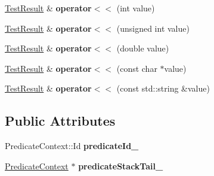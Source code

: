 \begin{DoxyCompactItemize}
\item 
\hypertarget{class_json_test_1_1_test_result_aa4e9ebaae16ffa2fa9538d4bd0ecdd4e}{\hyperlink{class_json_test_1_1_test_result}{Test\+Result} \& {\bfseries operator$<$$<$} (int value)}\label{class_json_test_1_1_test_result_aa4e9ebaae16ffa2fa9538d4bd0ecdd4e}

\item 
\hypertarget{class_json_test_1_1_test_result_a9023e594723a1711283c61b48f6fcefc}{\hyperlink{class_json_test_1_1_test_result}{Test\+Result} \& {\bfseries operator$<$$<$} (unsigned int value)}\label{class_json_test_1_1_test_result_a9023e594723a1711283c61b48f6fcefc}

\item 
\hypertarget{class_json_test_1_1_test_result_a5b8c77121387924383435fe747cf0f0c}{\hyperlink{class_json_test_1_1_test_result}{Test\+Result} \& {\bfseries operator$<$$<$} (double value)}\label{class_json_test_1_1_test_result_a5b8c77121387924383435fe747cf0f0c}

\item 
\hypertarget{class_json_test_1_1_test_result_ab04c79636e1bebcd6d38ecf7c8e24d10}{\hyperlink{class_json_test_1_1_test_result}{Test\+Result} \& {\bfseries operator$<$$<$} (const char $\ast$value)}\label{class_json_test_1_1_test_result_ab04c79636e1bebcd6d38ecf7c8e24d10}

\item 
\hypertarget{class_json_test_1_1_test_result_a81f7dfd1bf2233a93a8f04dfb0054a93}{\hyperlink{class_json_test_1_1_test_result}{Test\+Result} \& {\bfseries operator$<$$<$} (const std\+::string \&value)}\label{class_json_test_1_1_test_result_a81f7dfd1bf2233a93a8f04dfb0054a93}

\end{DoxyCompactItemize}
\subsection*{Public Attributes}
\begin{DoxyCompactItemize}
\item 
\hypertarget{class_json_test_1_1_test_result_a5bf0205db3dbf28a2d3d1ed32c931d9b}{Predicate\+Context\+::\+Id {\bfseries predicate\+Id\+\_\+}}\label{class_json_test_1_1_test_result_a5bf0205db3dbf28a2d3d1ed32c931d9b}

\item 
\hypertarget{class_json_test_1_1_test_result_aad36badc65d8a87e51949aa6460eea88}{\hyperlink{struct_json_test_1_1_predicate_context}{Predicate\+Context} $\ast$ {\bfseries predicate\+Stack\+Tail\+\_\+}}\label{class_json_test_1_1_test_result_aad36badc65d8a87e51949aa6460eea88}

\end{DoxyCompactItemize}


